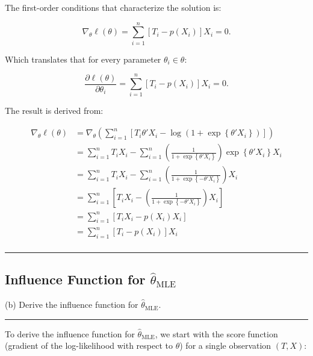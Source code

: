 \documentclass{article}
\newenvironment{colorparagraph}[1]{\par\color{#1}}{\par}
\begin{document}
The first-order conditions that characterize the solution is:

\[
\nabla_{\theta} \ell(\theta) = \sum_{i=1}^n \left[ T_i - p(X_i) \right] X_i = 0.
\]

Which translates that for every parameter $\theta_i \in \theta$: 

\[
\frac{\partial \ell(\theta)}{\partial \theta_i} = \sum_{i=1}^n \left[ T_i - p(X_i) \right] X_i = 0.
\]

The result is derived from:

\begin{align*}
  \nabla_{\theta} \ell(\theta)
  &= \nabla_{\theta} \left(\sum_{i=1}^n
    \left[
      T_i \theta' X_i - \log \left( 1 + \exp\left\{ \theta' X_i \right\} \right)
    \right]
    \right)
    \\
   &= 
   \sum_{i=1}^n
      T_i X_i
      -
    \sum_{i=1}^n
    \left(
      \frac{1}{1 + \exp\left\{ \theta' X_i \right\}}
    \right)
    \exp\left\{ \theta' X_i \right\} X_i
    \\
  &= 
    \sum_{i=1}^n
       T_i X_i
       -
     \sum_{i=1}^n
     \left(
       \frac{1}{1 + \exp\left\{ - \theta' X_i \right\}}
     \right)
     X_i
     \\
  &= 
     \sum_{i=1}^n
     \left[
        T_i X_i
        -
      \left(
        \frac{1}{1 + \exp\left\{ - \theta' X_i \right\}}
      \right)
      X_i
    \right] \\
  &= 
    \sum_{i=1}^n
    \left[
       T_i X_i
       -
     p(X_i)
     X_i
   \right] \\
  &= 
   \sum_{i=1}^n
   \left[
      T_i
      -
    p(X_i)
  \right]
  X_i \\
\end{align*}

\begin{colorparagraph}{questioncolor}
\label{q1b}
\rule{\textwidth}{0.5pt}
\subsection{Influence Function for \( \hat{\theta}_{\text{MLE}} \)}
(b) Derive the influence function for \( \hat{\theta}_{\text{MLE}} \).

\rule{\textwidth}{0.5pt}
\end{colorparagraph}

To derive the influence function for \( \hat{\theta}_{\text{MLE}} \), we start with the score function (gradient of the log-likelihood with respect to $\theta$) for a single observation \( (T, X) \):
\end{document}
